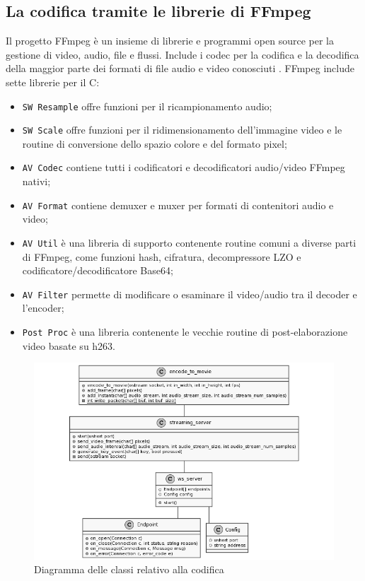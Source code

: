 \subsection{La codifica tramite le librerie di FFmpeg} \label{subsec:cap3_FFmpeg}
Il progetto FFmpeg è un insieme di librerie e programmi open source per la gestione di video, audio, file e flussi. Include i codec per la codifica e la decodifica della maggior parte dei formati di file audio e video conosciuti \parencite{FFmpeg_Documentation}. FFmpeg include sette librerie per il C:

\begin{itemize}
	\item \verb|SW Resample| offre funzioni per il ricampionamento audio;
	\item \verb|SW Scale| offre funzioni per il ridimensionamento dell'immagine video e le routine di conversione dello spazio colore e del formato pixel;
	\item \verb|AV Codec| contiene tutti i codificatori e decodificatori audio/video FFmpeg nativi;
	\item \verb|AV Format| contiene demuxer e muxer per formati di contenitori audio e video;
	\item \verb|AV Util| è una libreria di supporto contenente routine comuni a diverse parti di FFmpeg, come funzioni hash, cifratura, decompressore LZO e codificatore/decodificatore Base64;
	\item \verb|AV Filter| permette di modificare o esaminare il video/audio tra il decoder e l'encoder;
	\item \verb|Post Proc| è una libreria contenente le vecchie routine di post-elaborazione video basate su h263.
\end{itemize}


\begin{figure}[H]
	\includegraphics[width=\linewidth]{immagini/class_server_and_encoding}
	\caption{Diagramma delle classi relativo alla codifica}
	\label{fig:class_server_and_encoding}
\end{figure}

